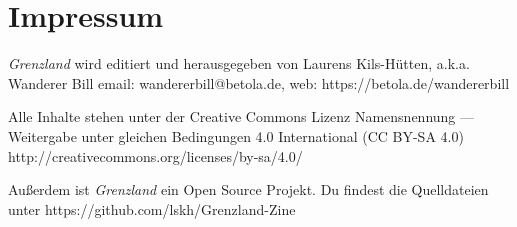 \documentclass[11pt]{wbzine}
\begin{document}
\section{Impressum}

\textit{Grenzland} wird editiert und
herausgegeben von Laurens Kils-Hütten,
a.k.a. Wanderer Bill
email: wandererbill@betola.de, web: https://betola.de/wandererbill

Alle Inhalte stehen unter der Creative Commons Lizenz
Namensnennung --- Weitergabe unter gleichen Bedingungen 4.0 International
(CC BY-SA 4.0)
http://creativecommons.org/licenses/by-sa/4.0/

Außerdem ist \textit{Grenzland} ein Open Source Projekt. Du
findest die Quelldateien unter https://github.com/lskh/Grenzland-Zine

\end{document}
